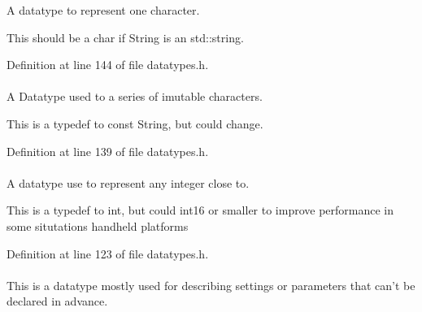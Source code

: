 A datatype to represent one character. 

This should be a char if String is an std\-::string. 

Definition at line 144 of file datatypes.\-h.

\hypertarget{namespaceMezzanine_a63cd699ac54b73953f35ec9cfc05e506}{
\paragraph[{Const\-String}]{}}\label{namespaceMezzanine_a63cd699ac54b73953f35ec9cfc05e506}


A Datatype used to a series of imutable characters. 

This is a typedef to const String, but could change. 

Definition at line 139 of file datatypes.\-h.

\hypertarget{namespaceMezzanine_ac3576e52af3c62d13dde94829e0c5465}{
\paragraph[{Integer}]{}}\label{namespaceMezzanine_ac3576e52af3c62d13dde94829e0c5465}


A datatype use to represent any integer close to. 

This is a typedef to int, but could int16 or smaller to improve performance in some situtations handheld platforms 

Definition at line 123 of file datatypes.\-h.

\hypertarget{namespaceMezzanine_ac9f30d4ba179aab9013e0c8fbf55bd28}{
\paragraph[{Name\-Value\-Pair\-List}]{}}\label{namespaceMezzanine_ac9f30d4ba179aab9013e0c8fbf55bd28}


This is a datatype mostly used for describing settings or parameters that can't be declared in advance. 

